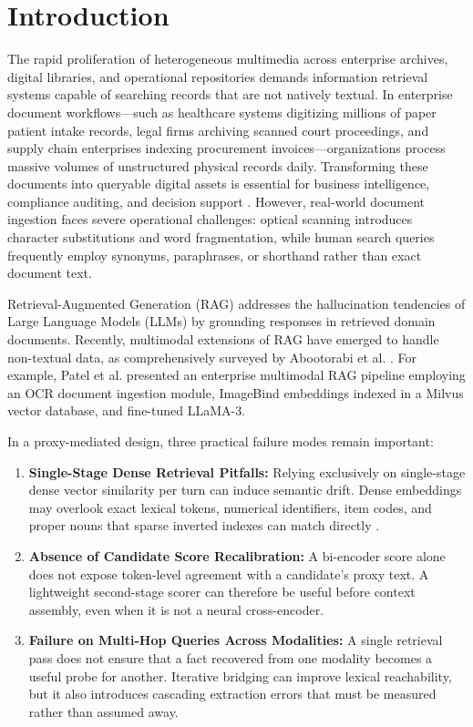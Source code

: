 \documentclass[conference]{IEEEtran}
\begin{document}
\section{Introduction}

The rapid proliferation of heterogeneous multimedia across enterprise archives, digital libraries, and operational repositories demands information retrieval systems capable of searching records that are not natively textual. In enterprise document workflows---such as healthcare systems digitizing millions of paper patient intake records, legal firms archiving scanned court proceedings, and supply chain enterprises indexing procurement invoices---organizations process massive volumes of unstructured physical records daily. Transforming these documents into queryable digital assets is essential for business intelligence, compliance auditing, and decision support \cite{jing2024llmvectordb}. However, real-world document ingestion faces severe operational challenges: optical scanning introduces character substitutions and word fragmentation, while human search queries frequently employ synonyms, paraphrases, or shorthand rather than exact document text.

Retrieval-Augmented Generation (RAG) \cite{lewis2020rag} addresses the hallucination tendencies of Large Language Models (LLMs) by grounding responses in retrieved domain documents. Recently, multimodal extensions of RAG have emerged to handle non-textual data, as comprehensively surveyed by Abootorabi et al. \cite{abootorabi2025multimodal}. For example, Patel et al. \cite{patel2025multimodal} presented an enterprise multimodal RAG pipeline employing an OCR document ingestion module, ImageBind embeddings indexed in a Milvus vector database, and fine-tuned LLaMA-3.

In a proxy-mediated design, three practical failure modes remain important:

\begin{enumerate}
    \setlength{\itemsep}{1pt plus 0.5pt}
    \setlength{\parskip}{0pt}
    \item \textbf{Single-Stage Dense Retrieval Pitfalls:} Relying exclusively on single-stage dense vector similarity per turn can induce semantic drift. Dense embeddings may overlook exact lexical tokens, numerical identifiers, item codes, and proper nouns that sparse inverted indexes can match directly \cite{robertson2009bm25}.
    \item \textbf{Absence of Candidate Score Recalibration:} A bi-encoder score alone does not expose token-level agreement with a candidate's proxy text. A lightweight second-stage scorer can therefore be useful before context assembly, even when it is not a neural cross-encoder.
    \item \textbf{Failure on Multi-Hop Queries Across Modalities:} A single retrieval pass does not ensure that a fact recovered from one modality becomes a useful probe for another. Iterative bridging can improve lexical reachability, but it also introduces cascading extraction errors that must be measured rather than assumed away.
\end{enumerate}
\end{document}
